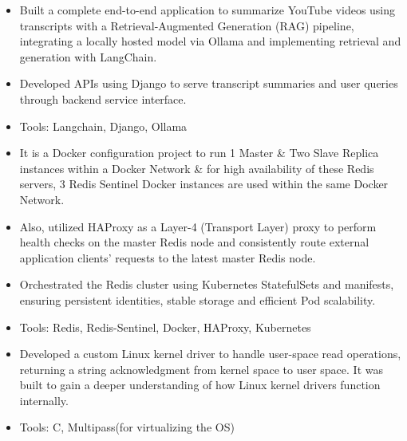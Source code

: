 \documentclass[10pt,a4paper,ragged2e,withhyper]{altacv}
\begin{document}
\vspace{0.3em}
\begin{itemize}
\item Built a complete end-to-end application to summarize YouTube videos using transcripts with a Retrieval-Augmented Generation (RAG) pipeline, integrating a locally hosted model via Ollama and implementing retrieval and generation with LangChain.
\item Developed APIs using Django to serve transcript summaries and user queries through backend service interface.
\item Tools: Langchain, Django, Ollama
\end{itemize}

\vspace{0.3em}
\begin{itemize}
\item It is a Docker configuration project to run 1 Master \& Two Slave Replica instances within a Docker Network \& for high availability of these Redis servers, 3 Redis Sentinel Docker instances are used within the same Docker Network.
\item Also, utilized HAProxy as a Layer-4 (Transport Layer) proxy to perform health checks on the master Redis node and consistently route external application clients' requests to the latest master Redis node.
\item Orchestrated the Redis cluster using Kubernetes StatefulSets and manifests, ensuring persistent identities, stable storage and efficient Pod scalability.
\item Tools: Redis, Redis-Sentinel, Docker, HAProxy, Kubernetes
\end{itemize}

\vspace{0.3em}
\begin{itemize}
\item Developed a custom Linux kernel driver to handle user-space read operations, returning a string acknowledgment from kernel space to user space. It was built to gain a deeper understanding of how Linux kernel drivers function internally.
\item Tools: C, Multipass(for virtualizing the OS)
\end{itemize}
\end{document}

